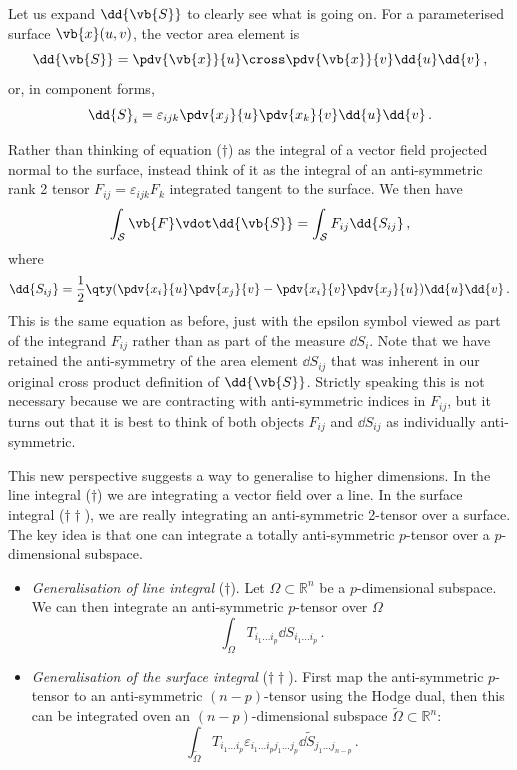 \documentclass{article}
\theoremstyle{plain}\theoremheaderfont{\normalfont\itshape}\theorembodyfont{\rmfamily}\theoremseparator{.}\newtheorem*{rem}{Remark}\newtheorem*{ex}{Example}\newtheorem*{proof}{Proof}\newtheorem*{altp}{Alternative proof}
\theoremstyle{plain}\theoremheaderfont{\normalfont\bfseries}\theorembodyfont{\rmfamily}\theoremseparator{.}\newtheorem{thm}{Theorem}[section]\newtheorem{lem}[thm]{Lemma}\newtheorem{prop}[thm]{Proposition}\newtheorem*{cor}{Corollary}\newtheorem{defn}[thm]{Definition}\newtheorem{clm}[thm]{Claim}\newtheorem{clminproof}{Claim}
\theoremstyle{break}\theoremheaderfont{\normalfont\itshape}\theorembodyfont{\rmfamily}\theoremseparator{.\medskip}\newtheorem*{proofskip}{Proof}\newtheorem*{exs}{Examples}\newtheorem*{rems}{Remarks}
\theoremstyle{break}\theoremheaderfont{\normalfont\bfseries}\theorembodyfont{\rmfamily}\theoremseparator{.\medskip}\newtheorem{lemskip}[thm]{Lemma}\newtheorem{defnskip}[thm]{Definition}\newtheorem{propskip}[thm]{Proposition}\newtheorem{thmskip}[thm]{Theorem}
\numberwithin{equation}{section}
\begin{document}
	Let us expand \(\dd{\vb{S}}\) to clearly see what is going on. For a parameterised surface \(\vb{x}(u,v)\), the vector area element is
	\[\dd{\vb{S}}=\pdv{\vb{x}}{u}\cross\pdv{\vb{x}}{v}\dd{u}\dd{v}\,,\]
	or, in component forms,
	\[\dd{S}_i=\varepsilon_{ijk}\pdv{x_j}{u}\pdv{x_k}{v}\dd{u}\dd{v}\,.\]

	Rather than thinking of equation (\(\dagger\)) as the integral of a vector field projected normal to the surface, instead think of it as the integral of an anti-symmetric rank 2 tensor \(F_{ij}=\varepsilon_{ijk}F_{k}\) integrated tangent to the surface. We then have
	\[\int_{\mathcal{S}}\vb{F}\vdot\dd{\vb{S}}=\int_\mathcal{S}F_{ij}\dd{S_{ij}}\,,\]
	where
	\[\dd{S_{ij}}=\frac{1}{2}\qty(\pdv{x_i}{u}\pdv{x_j}{v}-\pdv{x_i}{v}\pdv{x_j}{u})\dd{u}\dd{v}\,.\]
	This is the same equation as before, just with the epsilon symbol viewed as part of the integrand \(F_{ij}\) rather than as part of the measure \(\dd{S_i}\). Note that we have retained the anti-symmetry of the area element \(\dd{S_{ij}}\) that was inherent in our original cross product definition of \(\dd{\vb{S}}\). Strictly speaking this is not necessary because we are contracting with anti-symmetric indices in \(F_{ij}\), but it turns out that it is best to think of both objects \(F_{ij}\) and \(\dd{S_{ij}}\) as individually anti-symmetric.

	This new perspective suggests a way to generalise to higher dimensions. In the line integral (\(\dagger\)) we are integrating a vector field over a line. In the surface integral (\(\dagger\dagger\)), we are really integrating an anti-symmetric 2-tensor over a surface. The key idea is that one can integrate a totally anti-symmetric \(p\)-tensor over a \(p\)-dimensional subspace.

	\begin{itemize}
		\item \textit{Generalisation of line integral} (\(\dagger\)). Let \(\Omega\subset\mathbb{R}^n\) be a \(p\)-dimensional subspace. We can then integrate an anti-symmetric \(p\)-tensor over \(\Omega\)
		\[\int_\Omega T_{i_1\dots i_p}\dd{S_{i_1\dots i_p}}\,.\]
		\item \textit{Generalisation of the surface integral} (\(\dagger\dagger\)). First map the anti-symmetric \(p\)-tensor to an anti-symmetric \((n-p)\)-tensor using the Hodge dual, then this can be integrated oven an \((n-p)\)-dimensional subspace \(\tilde{\Omega}\subset\mathbb{R}^n\):
		\[\int_{\tilde{\Omega}}T_{i_1\dots i_p}\varepsilon_{i_1\dots i_p j_1\dots j_p}\dd{\tilde{S}_{j_1\dots j_{n-p}}}\,.\]
	\end{itemize}
\end{document}
